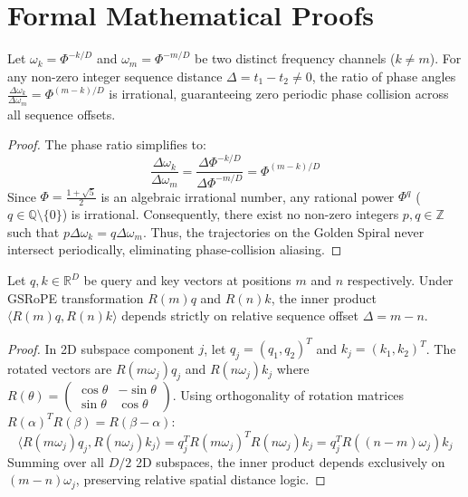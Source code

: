 \section{Formal Mathematical Proofs}

\begin{theorem}
Let $\omega_k = \Phi^{-k/D}$ and $\omega_m = \Phi^{-m/D}$ be two distinct frequency channels ($k \neq m$). For any non-zero integer sequence distance $\Delta = t_1 - t_2 \neq 0$, the ratio of phase angles $\frac{\Delta \omega_k}{\Delta \omega_m} = \Phi^{(m-k)/D}$ is irrational, guaranteeing zero periodic phase collision across all sequence offsets.
\end{theorem}

\begin{proof}
The phase ratio simplifies to:
\begin{equation}
    \frac{\Delta \omega_k}{\Delta \omega_m} = \frac{\Delta \Phi^{-k/D}}{\Delta \Phi^{-m/D}} = \Phi^{(m-k)/D}
\end{equation}
Since $\Phi = \frac{1+\sqrt{5}}{2}$ is an algebraic irrational number, any rational power $\Phi^{q}$ ($q \in \mathbb{Q} \setminus \{0\}$) is irrational. Consequently, there exist no non-zero integers $p, q \in \mathbb{Z}$ such that $p \Delta \omega_k = q \Delta \omega_m$. Thus, the trajectories on the Golden Spiral never intersect periodically, eliminating phase-collision aliasing.
\end{proof}

\begin{theorem}
Let $q, k \in \mathbb{R}^D$ be query and key vectors at positions $m$ and $n$ respectively. Under GSRoPE transformation $R(m)q$ and $R(n)k$, the inner product $\langle R(m)q, R(n)k \rangle$ depends strictly on relative sequence offset $\Delta = m - n$.
\end{theorem}

\begin{proof}
In 2D subspace component $j$, let $q_j = (q_1, q_2)^T$ and $k_j = (k_1, k_2)^T$. The rotated vectors are $R(m \omega_j) q_j$ and $R(n \omega_j) k_j$ where $R(\theta) = \begin{pmatrix} \cos\theta & -\sin\theta \\ \sin\theta & \cos\theta \end{pmatrix}$.
Using orthogonality of rotation matrices $R(\alpha)^T R(\beta) = R(\beta - \alpha)$:
\begin{equation}
    \langle R(m \omega_j) q_j, R(n \omega_j) k_j \rangle = q_j^T R(m \omega_j)^T R(n \omega_j) k_j = q_j^T R((n - m) \omega_j) k_j
\end{equation}
Summing over all $D/2$ 2D subspaces, the inner product depends exclusively on $(m - n) \omega_j$, preserving relative spatial distance logic.
\end{proof}